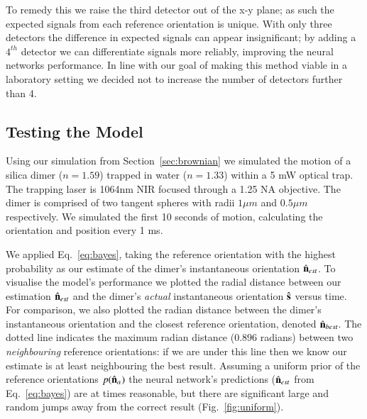 \documentclass[final,  3p]{elsarticle}
\begin{document}
To remedy this we raise the third detector out of the x-y plane; as such the expected signals from each reference orientation is unique. With only three detectors the difference in expected signals can appear insignificant; by adding a $4^{th}$ detector we can differentiate signals more reliably, improving the neural networks performance. In line with our goal of making this method viable in a laboratory setting we decided not to increase the number of detectors further than 4. 
\subsection{Testing the Model}
\label{sec:test}
Using our simulation from Section~\ref{sec:brownian} we simulated the motion of a silica dimer ($n = 1.59$) trapped in water ($n = 1.33$) within a 5 mW optical trap. The trapping laser is 1064nm NIR focused through a 1.25 NA objective. The dimer is comprised of two tangent spheres with radii $1 \mu m$ and $0.5 \mu m$ respectively. We simulated the first 10 seconds of motion, calculating the orientation and position every 1 ms. 

We applied Eq.~\eqref{eq:bayes}, taking the reference orientation with the highest probability  as our estimate of the dimer's instantaneous orientation $\hat{\bf n}_{est}$. To visualise the model's performance  we plotted the radial distance between our estimation $\hat{\bf n}_{est}$ and the dimer's \emph{actual} instantaneous orientation $\hat{\bf s}$ versus time. For comparison, we also plotted the radian distance between the  dimer's instantaneous orientation and the closest reference orientation, denoted $\hat{\bf n}_{best}$. The dotted line indicates the maximum radian distance ($0.896$ radians) between two \textit{neighbouring} reference orientations: if we are under this line then we know our estimate is at least neighbouring the best result. Assuming a uniform prior of the reference orientations $p(\hat{\bf n}_\alpha)$  the neural network's predictions ($\hat{\bf n}_{est}$ from Eq.~\eqref{eq:bayes}) are at times reasonable, but there are significant large and random jumps away from the correct result (Fig.~\ref{fig:uniform}). 
\end{document}
